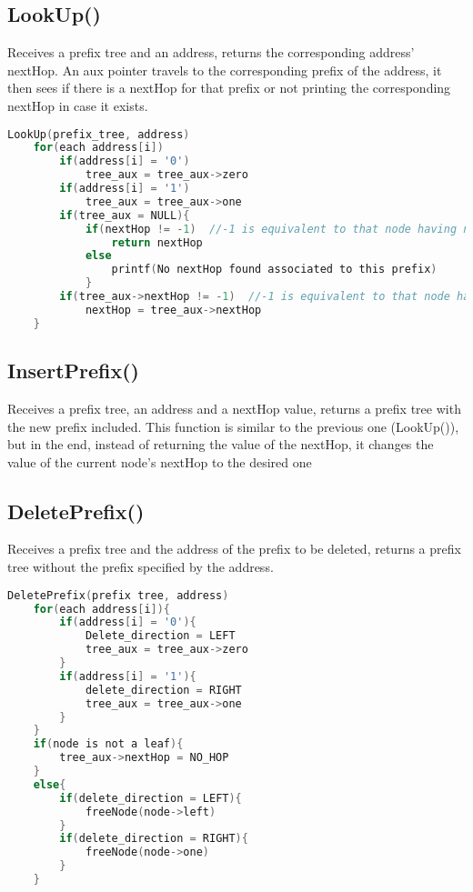 \documentclass[a4paper]{article}
\begin{document}
\subsection{LookUp()}

Receives a prefix tree and an address, returns the corresponding address’ nextHop. An aux pointer travels to the corresponding prefix of the address, it then sees if there is a nextHop for that prefix or not printing the corresponding nextHop in case it exists.
\begin{lstlisting}[language=c]
LookUp(prefix_tree, address)
    for(each address[i])
        if(address[i] = '0')
            tree_aux = tree_aux->zero
        if(address[i] = '1')
            tree_aux = tree_aux->one
        if(tree_aux = NULL){
            if(nextHop != -1)  //-1 is equivalent to that node having no nextHop
                return nextHop
            else
                printf(No nextHop found associated to this prefix)
            }
        if(tree_aux->nextHop != -1)  //-1 is equivalent to that node having no nextHop
            nextHop = tree_aux->nextHop
    }
\end{lstlisting}

\subsection{InsertPrefix()}

Receives a prefix tree, an address and a nextHop value, returns a prefix tree with the new prefix included. This function is similar to the previous one (LookUp()), but in the end, instead of returning the value of the nextHop, it changes the value of the current node’s nextHop to the desired one

\subsection{DeletePrefix()}

Receives a prefix tree and the address of the prefix to be deleted, returns a prefix tree without the prefix specified by the address.
\begin{lstlisting}[language=c]
DeletePrefix(prefix tree, address)
    for(each address[i]){
        if(address[i] = '0'){
            Delete_direction = LEFT
            tree_aux = tree_aux->zero
        }
        if(address[i] = '1'){
            delete_direction = RIGHT
            tree_aux = tree_aux->one
        }
    }
    if(node is not a leaf){
        tree_aux->nextHop = NO_HOP
    }
    else{
        if(delete_direction = LEFT){
            freeNode(node->left)
        }
        if(delete_direction = RIGHT){
            freeNode(node->one)
        }
    }
\end{lstlisting}
\end{document}
